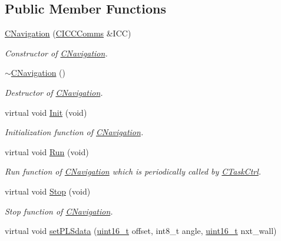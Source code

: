 \subsection*{Public Member Functions}
\begin{DoxyCompactItemize}
\item 
\mbox{\hyperlink{class_c_navigation_a0527efabaf4644c8c4e7910efec36e82}{C\+Navigation}} (\mbox{\hyperlink{class_c_i_c_c_comms}{C\+I\+C\+C\+Comms}} \&I\+CC)
\begin{DoxyCompactList}\small\item\em Constructor of \mbox{\hyperlink{class_c_navigation}{C\+Navigation}}. \end{DoxyCompactList}\item 
\mbox{\hyperlink{class_c_navigation_ae4c7c3e27ded45a94bc268634a7739da}{$\sim$\+C\+Navigation}} ()
\begin{DoxyCompactList}\small\item\em Destructor of \mbox{\hyperlink{class_c_navigation}{C\+Navigation}}. \end{DoxyCompactList}\item 
virtual void \mbox{\hyperlink{class_c_navigation_a86a0756663ccf76e9c474764b8f7a04f}{Init}} (void)
\begin{DoxyCompactList}\small\item\em Initialization function of \mbox{\hyperlink{class_c_navigation}{C\+Navigation}}. \end{DoxyCompactList}\item 
virtual void \mbox{\hyperlink{class_c_navigation_a86acb1521aab400e542465c8eabed671}{Run}} (void)
\begin{DoxyCompactList}\small\item\em Run function of \mbox{\hyperlink{class_c_navigation}{C\+Navigation}} which is periodically called by \mbox{\hyperlink{class_c_task_ctrl}{C\+Task\+Ctrl}}. \end{DoxyCompactList}\item 
virtual void \mbox{\hyperlink{class_c_navigation_a3cc8f7fdd003d6b2c5056b87ff93edd9}{Stop}} (void)
\begin{DoxyCompactList}\small\item\em Stop function of \mbox{\hyperlink{class_c_navigation}{C\+Navigation}}. \end{DoxyCompactList}\item 
virtual void \mbox{\hyperlink{class_c_navigation_a53f0409677e36f62ef232f7e15b32948}{set\+P\+L\+Sdata}} (\mbox{\hyperlink{_a_d_a_s___types_8h_a1f1825b69244eb3ad2c7165ddc99c956}{uint16\+\_\+t}} offset, int8\+\_\+t angle, \mbox{\hyperlink{_a_d_a_s___types_8h_a1f1825b69244eb3ad2c7165ddc99c956}{uint16\+\_\+t}} nxt\+\_\+wall)

\end{DoxyCompactItemize}
